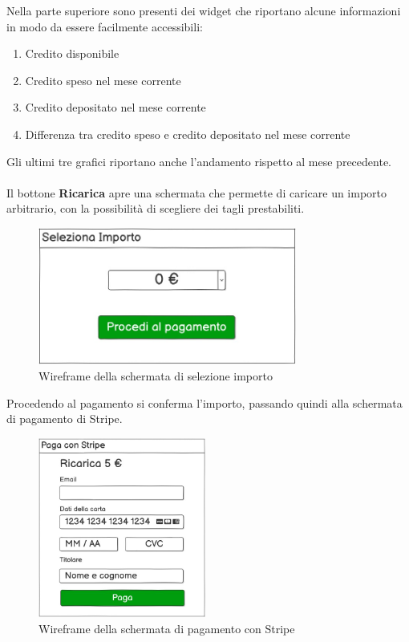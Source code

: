 Nella parte superiore sono presenti dei widget che riportano alcune informazioni in modo da essere facilmente accessibili:
\begin{enumerate}
  \item Credito disponibile
  \item Credito speso  nel mese corrente
  \item Credito depositato nel mese corrente
  \item Differenza tra credito speso e credito depositato nel mese corrente
\end{enumerate}
Gli ultimi tre grafici riportano anche l'andamento rispetto al mese precedente.
\\\\
Il bottone \textbf{Ricarica} apre una schermata che permette di caricare un importo arbitrario, con la possibilit\`a di scegliere
dei tagli prestabiliti.

\begin{figure}[H]
  \centering
  \includegraphics[width=8.5cm]{images/gestione-wallet/mock-seleziona-importo.png}
  \caption{Wireframe della schermata di selezione importo }
\end{figure}
Procedendo al pagamento si conferma l'importo, passando quindi alla schermata di pagamento di Stripe.

\begin{figure}[H]
  \centering
  \includegraphics[width=5.5cm]{images/gestione-wallet/mock-stripe.png}
  \caption{Wireframe della schermata di pagamento con Stripe }
\end{figure}


